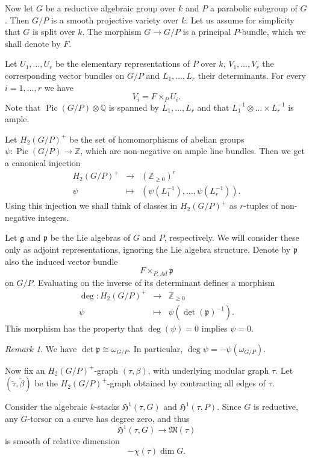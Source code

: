 \documentclass[11pt]{article}
\newcommand{\Gg}{\mathfrak{g}}
\newcommand{\HH}{\mathfrak{H}}
\newcommand{\MM}{\mathfrak{M}}
\DeclareMathOperator{\Pic}{Pic}
\newcommand{\Pp}{\mathfrak{p}}
\newcommand{\qq}{\mathbb{Q}}
\renewcommand{\tilde}{\widetilde}
\newcommand{\zz}{\mathbb{Z}}
\theoremstyle{plain}
\theoremstyle{remark}
\newtheorem*{rmk}{Remark}
\theoremstyle{plain}
\theoremstyle{definition}
\theoremstyle{remark}
\begin{document}
Now let \(G\) be a reductive algebraic group over \(k\) and \(P\) a
parabolic subgroup of \(G\). Then \(G/P\) is a smooth projective variety
over \(k\). Let us assume for simplicity that \(G\) is split over \(k\). The
morphism \(G\rightarrow G/P\) is a principal \(P\)-bundle, which we shall
denote by \(F\).

Let \(U_1,\ldots,U_r\) be the elementary representations of \(P\) over
\(k\), \(V_1,\ldots,V_r\) the corresponding vector bundles on \(G/P\) and
\(L_1,\ldots,L_r\) their determinants. For every \(i=1,\ldots,r\) we have
\[
V_i=F\times_PU_i.
\]
Note that \(\Pic(G/P)\otimes\qq\) is spanned by \(L_1,\ldots,L_r\) and
that \(L_1^{-1}\otimes\ldots\times L_r^{-1}\) is ample.

Let \(H_2(G/P)^+\) be the set of homomorphisms of abelian groups
\(\psi:\Pic(G/P)\rightarrow\zz\), which are non-negative on ample line
bundles. Then we get a canonical injection
\begin{eqnarray*}
H_2(G/P)^+ & \longrightarrow & (\zz_{\geq0})^r\\
\psi       & \longmapsto     & (\psi(L_1^{-1}),\ldots,\psi(L_r^{-1})).
\end{eqnarray*}
Using this injection we shall think of classes in \(H_2(G/P)^+\) as
\(r\)-tuples of non-negative integers.

Let \(\Gg\) and \(\Pp\) be the Lie algebras of \(G\) and \(P\),
respectively. We will consider these only as adjoint representations,
ignoring the Lie algebra structure. Denote by \(\Pp\) also the induced
vector bundle
\[
F\times_{P,Ad}\Pp
\]
on \(G/P\). Evaluating on the inverse of its determinant defines a
morphism
\begin{eqnarray*}
\deg:H_2(G/P)^+ & \longrightarrow & \zz_{\geq0} \\
\psi            & \longmapsto     & \psi(\det(\Pp)^{-1}).
\end{eqnarray*}
This morphism has the property that \(\deg(\psi)=0\) implies \(\psi=0\).

\begin{rmk}
We have \(\det\Pp\cong\omega_{G/P}\). In particular,
\(\deg\psi=-\psi(\omega_{G/P})\).
\end{rmk}

Now fix an \(H_2(G/P)^+\)-graph \((\tau,\beta)\), with underlying modular
graph \(\tau\). Let \((\tilde{\tau},\tilde{\beta})\) be the \(H_2(G/P)^+\)-graph
obtained by contracting all edges of \(\tau\).

Consider the algebraic \(k\)-stacks \(\HH^1(\tau,G)\) and
\(\HH^1(\tau,P)\). Since \(G\) is reductive, any \(G\)-torsor
on a curve has degree zero, and thus
\[
\HH^1(\tau,G)\longrightarrow\MM(\tau)
\]
is smooth of relative dimension
\[
-\chi(\tau)\dim G.
\]
\end{document}
